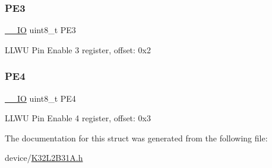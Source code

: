 \subsubsection{\texorpdfstring{PE3}{PE3}}
{\footnotesize\ttfamily \mbox{\hyperlink{core__cm0plus_8h_aec43007d9998a0a0e01faede4133d6be}{\+\_\+\+\_\+\+IO}} uint8\+\_\+t P\+E3}

L\+L\+WU Pin Enable 3 register, offset\+: 0x2 \mbox{\label{struct_l_l_w_u___type_a7c081e6d23713bc4eec0ab17965a8dff}} 
\subsubsection{\texorpdfstring{PE4}{PE4}}
{\footnotesize\ttfamily \mbox{\hyperlink{core__cm0plus_8h_aec43007d9998a0a0e01faede4133d6be}{\+\_\+\+\_\+\+IO}} uint8\+\_\+t P\+E4}

L\+L\+WU Pin Enable 4 register, offset\+: 0x3 

The documentation for this struct was generated from the following file\+:\begin{DoxyCompactItemize}
\item 
device/\mbox{\hyperlink{_k32_l2_b31_a_8h}{K32\+L2\+B31\+A.\+h}}\end{DoxyCompactItemize}
